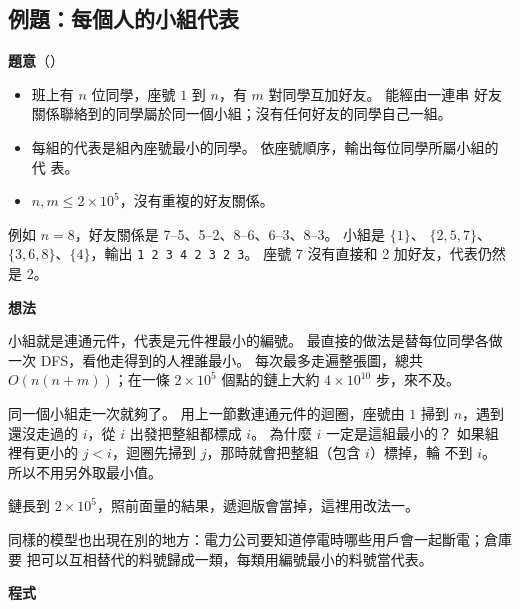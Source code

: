 \subsection{例題：每個人的小組代表}
\label{sec:ex-group}

\textbf{題意}（）

\begin{itemize}
\item 班上有 $n$ 位同學，座號 $1$ 到 $n$，有 $m$ 對同學互加好友。 能經由一連串
好友關係聯絡到的同學屬於同一個小組；沒有任何好友的同學自己一組。
\item 每組的代表是組內座號最小的同學。 依座號順序，輸出每位同學所屬小組的代
表。
\item $n, m \le 2 \times 10^5$，沒有重複的好友關係。
\end{itemize}

例如 $n = 8$，好友關係是 7--5、5--2、8--6、6--3、8--3。 小組是 $\{1\}$、
$\{2, 5, 7\}$、$\{3, 6, 8\}$、$\{4\}$，輸出 \texttt{1 2 3 4 2 3 2 3}。 座號 7
沒有直接和 2 加好友，代表仍然是 2。

\textbf{想法}

小組就是連通元件，代表是元件裡最小的編號。 最直接的做法是替每位同學各做一次
DFS，看他走得到的人裡誰最小。 每次最多走遍整張圖，總共 $O(n(n + m))$；在一條
$2 \times 10^5$ 個點的鏈上大約 $4 \times 10^{10}$ 步，來不及。

同一個小組走一次就夠了。 用上一節數連通元件的迴圈，座號由 $1$ 掃到 $n$，遇到
還沒走過的 $i$，從 $i$ 出發把整組都標成 $i$。 為什麼 $i$ 一定是這組最小的？
如果組裡有更小的 $j < i$，迴圈先掃到 $j$，那時就會把整組（包含 $i$）標掉，輪
不到 $i$。 所以不用另外取最小值。

鏈長到 $2 \times 10^5$，照前面量的結果，遞迴版會當掉，這裡用改法一。

同樣的模型也出現在別的地方：電力公司要知道停電時哪些用戶會一起斷電；倉庫要
把可以互相替代的料號歸成一類，每類用編號最小的料號當代表。

\textbf{程式}

